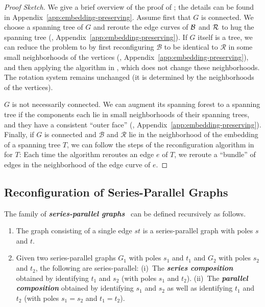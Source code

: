 \documentclass[a4paper,USenglish,cleveref,colorlinks=true,urlcolor=black,linkcolor=black,citecolor=black,thm-restate,authorcolumns]{lipics-v2021}
\theoremstyle{claimstyle}
\def\defn#1{\textit{\textbf{\boldmath #1}}}
\renewcommand{\emph}[1]{\defn{#1}}
\begin{document}
\begin{proof}[Proof Sketch]
    We give a brief overview of the proof of ; the details can be found in Appendix~\ref{app:embedding-preserving}.
    Assume first that $G$ is connected. We choose a spanning tree of $G$ and reroute the edge curves of $\cal B$ and $\cal R$ to hug the spanning tree (, Appendix~\ref{app:embedding-preserving}).
    If $G$ itself is a tree, we can reduce the problem to  by first reconfiguring $\mathcal{B}$ to be identical to $\mathcal{R}$ in some small neighborhoods of the vertices (, Appendix~\ref{app:embedding-preserving}), and then applying the algorithm in , which does not change these neighborhoods.
    The rotation system remains unchanged (it is determined by the neighborhoods of the vertices).

    $G$ is not necessarily connected.
    We can augment its spanning forest to a spanning tree if the components each lie in small neighborhoods of their spanning trees, and they have a consistent \enquote{outer face} (, Appendix~\ref{app:embedding-preserving}).
    Finally, if $G$ is connected and $\mathcal{B}$ and $\mathcal{R}$ lie in the neighborhood of the embedding of a spanning tree $T$, we can follow the steps of the reconfiguration algorithm in  for $T$: Each time the algorithm reroutes an edge $e$ of $T$, we reroute a \enquote{bundle} of edges in the neighborhood of the edge curve of $e$.
\end{proof}


\subsection{Reconfiguration of Series-Parallel Graphs}
\label{ssec:series-parallel}

The family of \emph{series-parallel graphs}~\cite{DUFFIN1965303}  can be defined recursively as follows.
\begin{enumerate}
    \item The graph consisting of a single edge $st$ is a series-parallel graph with poles $s$ and $t$.
    \item Given two series-parallel graphs $G_1$ with poles $s_1$ and $t_1$ and $G_2$ with poles $s_2$ and $t_2$, the following are series-parallel: (i)~The \emph{series composition} obtained by identifying $t_1$ and $s_2$ (with poles $s_1$ and $t_2$). (ii)~The \emph{parallel composition} obtained by identifying $s_1$ and $s_2$ as well as identifying $t_1$ and $t_2$ (with poles $s_1=s_2$ and $t_1=t_2$).
\end{enumerate}
\end{document}
